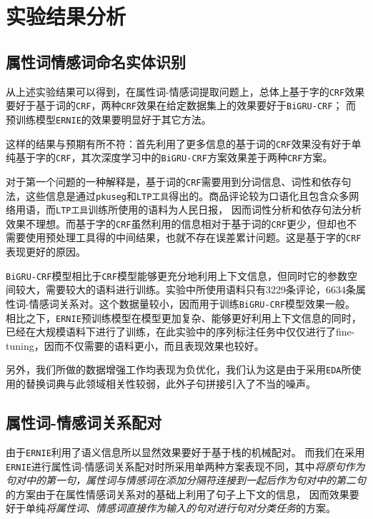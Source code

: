 \documentclass[11pt,a4paper]{article}
\begin{document}
\section{实验结果分析}

\subsection{属性词情感词命名实体识别}
从上述实验结果可以得到，在属性词-情感词提取问题上，总体上基于字的\texttt{CRF}效果要好于基于词的\texttt{CRF}，两种\texttt{CRF}效果在给定数据集上的效果要好于\texttt{BiGRU-CRF}；
而预训练模型\texttt{ERNIE}的效果要明显好于其它方法。

这样的结果与预期有所不符：首先利用了更多信息的基于词的\texttt{CRF}效果没有好于单纯基于字的\texttt{CRF}，其次深度学习中的\texttt{BiGRU-CRF}方案效果差于两种\texttt{CRF}方案。

对于第一个问题的一种解释是，基于词的\texttt{CRF}需要用到分词信息、词性和依存句法，这些信息是通过\texttt{pkuseg}和\texttt{LTP工具}得出的。商品评论较为口语化且包含众多网络用语，而\texttt{LTP工具}训练所使用的语料为人民日报，
因而词性分析和依存句法分析效果不理想。而基于字的\texttt{CRF}虽然利用的信息相对于基于词的\texttt{CRF}更少，但却也不需要使用预处理工具得的中间结果，也就不存在误差累计问题。这是基于字的\texttt{CRF}表现更好的原因。

\texttt{BiGRU-CRF}模型相比于\texttt{CRF}模型能够更充分地利用上下文信息，但同时它的参数空间较大，需要较大的语料进行训练。实验中所使用语料只有3229条评论，6634条属性词-情感词关系对。这个数据量较小，因而用于训练\texttt{BiGRU-CRF}模型效果一般。
相比之下，\texttt{ERNIE}预训练模型在模型更加复杂、能够更好利用上下文信息的同时，已经在大规模语料下进行了训练，在此实验中的序列标注任务中仅仅进行了fine-tuning，因而不仅需要的语料更小，而且表现效果也较好。

另外，我们所做的数据增强工作均表现为负优化，我们认为这是由于采用\texttt{EDA}所使用的替换词典与此领域相关性较弱，此外子句拼接引入了不当的噪声。

\subsection{属性词-情感词关系配对}
由于\texttt{ERNIE}利用了语义信息所以显然效果要好于基于栈的机械配对。
而我们在采用\texttt{ERNIE}进行属性词-情感词关系配对时所采用单两种方案表现不同，其中\textit{将原句作为句对中的第一句，属性词与情感词在添加分隔符连接到一起后作为句对中的第二句}的方案由于在属性情感词关系对的基础上利用了句子上下文的信息，
因而效果要好于单纯\textit{将属性词、情感词直接作为输入的句对进行句对分类任务}的方案。
\end{document}
